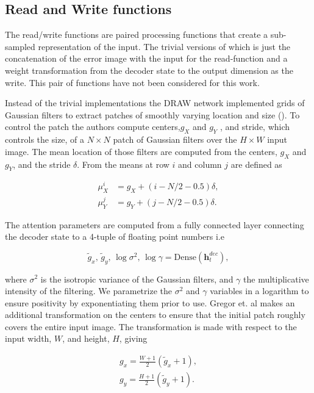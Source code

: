  \subsection{Read and Write functions}

 The read/write functions are paired processing functions that create a sub-sampled representation of the input. The trivial versions of which is just the concatenation of the error image with the input for the read-function and a weight transformation from the decoder state to the output dimension as the write. This pair of functions have not been considered for this work. 

 Instead of the trivial implementations the DRAW network implemented grids of Gaussian filters to extract patches of smoothly varying location and size (\cite{Gregor2015}). To control the patch the authors compute centers,$g_X$ and $g_Y$ , and stride, which controls the size, of a $N \times N$ patch of Gaussian filters over the $H \times W$ input image. The mean location of those filters are computed from the centers, $g_X$ and $g_Y$, and the stride $\delta$. From \citet{Gregor2015} the means at row $i$ and column $j$ are defined as 

 \begin{align}
 \mu_X^i &= g_X + (i - N/2-0.5)\delta, \\
 \mu_Y^j &= g_Y + (j - N/2-0.5)\delta.
 \end{align}

\noindent The attention parameters are computed from a fully connected layer connecting the decoder state to a 4-tuple of floating point numbers i.e

\begin{equation}\label{eq:draw_params}
\tilde{g}_x, \,\tilde{g}_y, \, \log \sigma^2, \, \log \gamma = \text{Dense} (\mathbf{h}_t^{dec}),
\end{equation}

\noindent where $\sigma^2$ is the isotropic variance of the Gaussian filters, and $\gamma$ the multiplicative intensity of the filtering. We parametrize the $\sigma^2$ and $\gamma$ variables in a logarithm to ensure positivity by exponentiating them prior to use. Gregor et. al makes an additional transformation on the centers to ensure that the initial patch roughly covers the entire input image. The transformation is made with respect to the input width, $W$, and height, $H$, giving

\begin{align}
g_x = \frac{W +1 }{2} (\tilde{g}_x +1 ), \\
g_y = \frac{H +1 }{2} (\tilde{g}_y +1 ). \\
\end{align}

